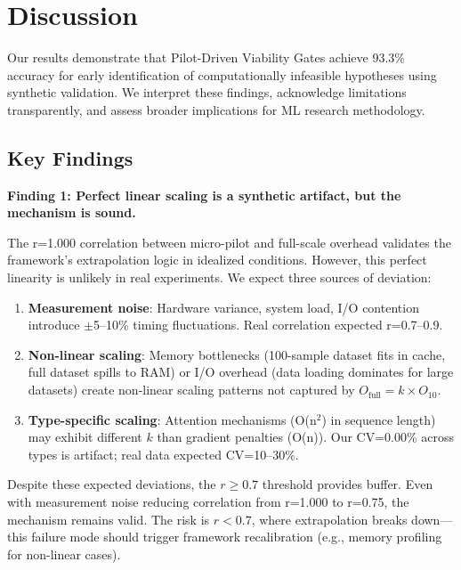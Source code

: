 \section{Discussion}

Our results demonstrate that Pilot-Driven Viability Gates achieve 93.3\% accuracy for early identification of computationally infeasible hypotheses using synthetic validation. We interpret these findings, acknowledge limitations transparently, and assess broader implications for ML research methodology.

\subsection{Key Findings}

\textbf{Finding 1: Perfect linear scaling is a synthetic artifact, but the mechanism is sound.}

The r=1.000 correlation between micro-pilot and full-scale overhead validates the framework's extrapolation logic in idealized conditions. However, this perfect linearity is unlikely in real experiments. We expect three sources of deviation:

\begin{enumerate}
\item \textbf{Measurement noise}: Hardware variance, system load, I/O contention introduce $\pm$5--10\% timing fluctuations. Real correlation expected r=0.7--0.9.

\item \textbf{Non-linear scaling}: Memory bottlenecks (100-sample dataset fits in cache, full dataset spills to RAM) or I/O overhead (data loading dominates for large datasets) create non-linear scaling patterns not captured by $O_{\text{full}} = k \times O_{10}$.

\item \textbf{Type-specific scaling}: Attention mechanisms (O(n$^2$) in sequence length) may exhibit different $k$ than gradient penalties (O(n)). Our CV=0.00\% across types is artifact; real data expected CV=10--30\%.
\end{enumerate}

Despite these expected deviations, the $r \geq 0.7$ threshold provides buffer. Even with measurement noise reducing correlation from r=1.000 to r=0.75, the mechanism remains valid. The risk is $r < 0.7$, where extrapolation breaks down---this failure mode should trigger framework recalibration (e.g., memory profiling for non-linear cases).

